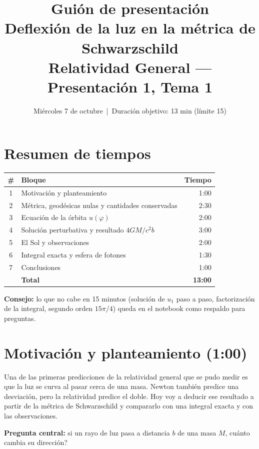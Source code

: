 \documentclass[11pt,a4paper]{article}
\title{Gui\'on de presentaci\'on\\[2pt]\large Deflexi\'on de la luz en la m\'etrica de Schwarzschild\\Relatividad General --- Presentaci\'on 1, Tema 1}
\author{}
\date{Mi\'ercoles 7 de octubre \,|\, Duraci\'on objetivo: 13 min (l\'imite 15)}
\begin{document}
\maketitle

\section*{Resumen de tiempos}
\begin{center}
\begin{tabular}{@{}clr@{}}
\toprule
\# & Bloque & Tiempo \\
\midrule
1 & Motivaci\'on y planteamiento & 1:00 \\
2 & M\'etrica, geod\'esicas nulas y cantidades conservadas & 2:30 \\
3 & Ecuaci\'on de la \'orbita $u(\varphi)$ & 2:00 \\
4 & Soluci\'on perturbativa y resultado $4GM/c^2b$ & 3:00 \\
5 & El Sol y observaciones & 2:00 \\
6 & Integral exacta y esfera de fotones & 1:30 \\
7 & Conclusiones & 1:00 \\
\midrule
 & \textbf{Total} & \textbf{13:00} \\
\bottomrule
\end{tabular}
\end{center}

\noindent\textbf{Consejo:} lo que no cabe en 15 minutos (soluci\'on de $u_1$ paso a paso, factorizaci\'on de la integral, segundo orden $15\pi/4$) queda en el notebook como respaldo para preguntas.

\section{Motivaci\'on y planteamiento \hfill\small(1:00)}

\begin{decir}
Una de las primeras predicciones de la relatividad general que se pudo medir es que la luz se curva al pasar cerca de una masa. Newton tambi\'en predice una desviaci\'on, pero la relatividad predice el doble. Hoy voy a deducir ese resultado a partir de la m\'etrica de Schwarzschild y compararlo con una integral exacta y con las observaciones.
\end{decir}

\noindent\textbf{Pregunta central:} si un rayo de luz pasa a distancia $b$ de una masa $M$, \textquestiondown cu\'anto cambia su direcci\'on?
\end{document}
